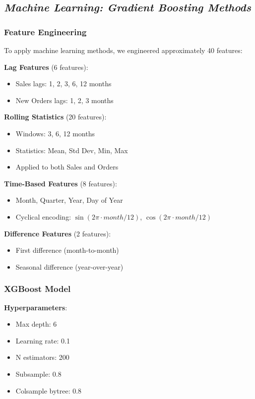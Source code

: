 \documentclass[12pt]{article}
\begin{document}
\subsection*{\textit{Machine Learning: Gradient Boosting Methods}}

\subsubsection*{Feature Engineering}

To apply machine learning methods, we engineered approximately 40 features:

\textbf{Lag Features} (6 features):
\begin{itemize}
    \item Sales lags: 1, 2, 3, 6, 12 months
    \item New Orders lags: 1, 2, 3 months
\end{itemize}

\textbf{Rolling Statistics} (20 features):
\begin{itemize}
    \item Windows: 3, 6, 12 months
    \item Statistics: Mean, Std Dev, Min, Max
    \item Applied to both Sales and Orders
\end{itemize}

\textbf{Time-Based Features} (8 features):
\begin{itemize}
    \item Month, Quarter, Year, Day of Year
    \item Cyclical encoding: $\sin(2\pi \cdot month/12)$, $\cos(2\pi \cdot month/12)$
\end{itemize}

\textbf{Difference Features} (2 features):
\begin{itemize}
    \item First difference (month-to-month)
    \item Seasonal difference (year-over-year)
\end{itemize}

\subsubsection*{XGBoost Model}

\textbf{Hyperparameters}:
\begin{itemize}
    \item Max depth: 6
    \item Learning rate: 0.1
    \item N estimators: 200
    \item Subsample: 0.8
    \item Colsample bytree: 0.8
\end{itemize}
\end{document}
